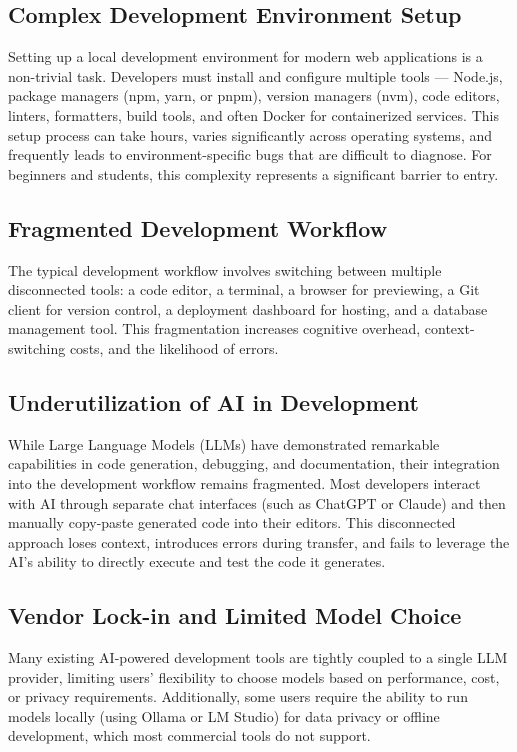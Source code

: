 \documentclass[12pt,a4paper,openany]{report}
\begin{document}
\subsection{Complex Development Environment Setup}
Setting up a local development environment for modern web applications is a non-trivial task. Developers must install and configure multiple tools --- Node.js, package managers (npm, yarn, or pnpm), version managers (nvm), code editors, linters, formatters, build tools, and often Docker for containerized services. This setup process can take hours, varies significantly across operating systems, and frequently leads to environment-specific bugs that are difficult to diagnose. For beginners and students, this complexity represents a significant barrier to entry.

\subsection{Fragmented Development Workflow}
The typical development workflow involves switching between multiple disconnected tools: a code editor, a terminal, a browser for previewing, a Git client for version control, a deployment dashboard for hosting, and a database management tool. This fragmentation increases cognitive overhead, context-switching costs, and the likelihood of errors.

\subsection{Underutilization of AI in Development}
While Large Language Models (LLMs) have demonstrated remarkable capabilities in code generation, debugging, and documentation, their integration into the development workflow remains fragmented. Most developers interact with AI through separate chat interfaces (such as ChatGPT or Claude) and then manually copy-paste generated code into their editors. This disconnected approach loses context, introduces errors during transfer, and fails to leverage the AI's ability to directly execute and test the code it generates.

\subsection{Vendor Lock-in and Limited Model Choice}
Many existing AI-powered development tools are tightly coupled to a single LLM provider, limiting users' flexibility to choose models based on performance, cost, or privacy requirements. Additionally, some users require the ability to run models locally (using Ollama or LM Studio) for data privacy or offline development, which most commercial tools do not support.
\end{document}
